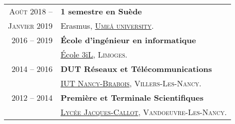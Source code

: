 \begin{supertabular}{rl}
    \textsc{Ao\^ut 2018 --} & \textbf{1 semestre en Su\`ede}\\
    \textsc{Janvier 2019} & Erasmus, \href{https://www.umu.se/en}{\textsc{Umeå university}}.\\[1.5ex]
    \textsc{2016 -- 2019} & \textbf{\'Ecole d'ing\'enieur en informatique}\\
    & \href{https://www.3il-ingenieurs.fr/en}{\'Ecole 3iL}, \textsc{Limoges}.\\[1.5ex]
    \textsc{2014 -- 2016} & \textbf{DUT R\'eseaux et T\'el\'ecommunications}\\
    & \href{https://iutnb.univ-lorraine.fr/fr/content/rt-dut}{\textsc{IUT Nancy-Brabois}}, \textsc{Villers-Les-Nancy}.\\[1.5ex]
    \textsc{2012 -- 2014} & \textbf{Premi\`ere et Terminale Scientifiques}\\
    & \href{http://www4.ac-nancy-metz.fr/lyc-jacques-callot}{\textsc{Lyc\'ee Jacques-Callot}}, \textsc{Vandoeuvre-Les-Nancy}.\\
\end{supertabular}

\medskip
